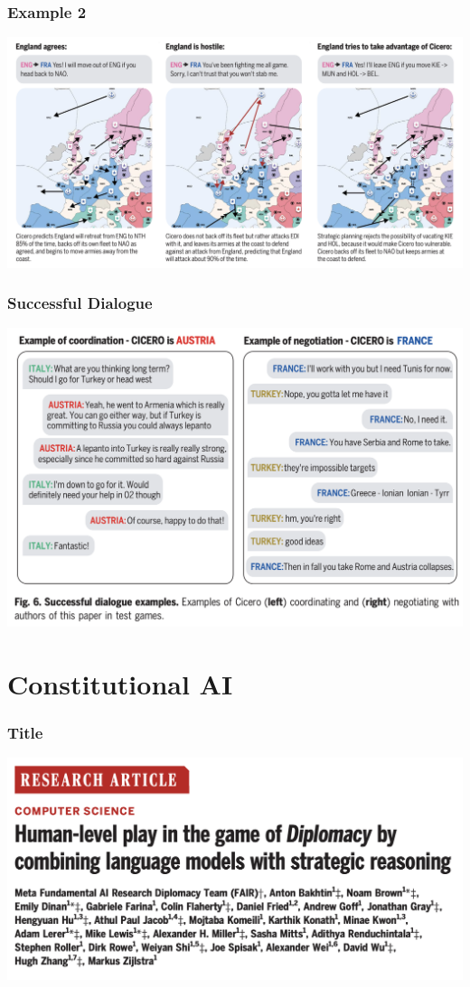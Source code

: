 \documentclass[xcolor=dvipsnames]{beamer}
\newcommand{\0}{\vec{0}}
\begin{document}
\begin{frame}
	\frametitle{Example 2}
	\begin{center}
		\includegraphics[width=\textwidth]{Bakhtin4}
	\end{center}
\end{frame}
\begin{frame}
	\frametitle{Successful Dialogue}
	\begin{center}
		\includegraphics[scale=0.4]{Bakhtin2}
	\end{center}
\end{frame}

\section{Constitutional AI}
\begin{frame}
	\frametitle{Title}
	\begin{center}
		\includegraphics[width=\textwidth]{Bakhtin0}
	\end{center}
\end{frame}
\end{document}

